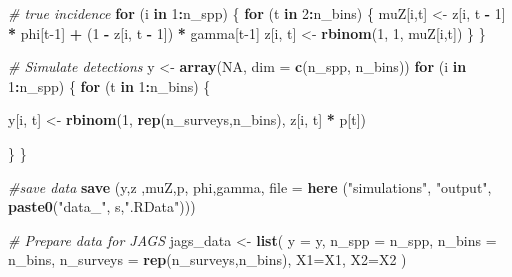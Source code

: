 \documentclass[
]{article}
\newenvironment{Shaded}{\begin{snugshade}}{\end{snugshade}}
\newcommand{\AttributeTok}[1]{\textcolor[rgb]{0.13,0.29,0.53}{#1}}
\newcommand{\CommentTok}[1]{\textcolor[rgb]{0.56,0.35,0.01}{\textit{#1}}}
\newcommand{\ConstantTok}[1]{\textcolor[rgb]{0.56,0.35,0.01}{#1}}
\newcommand{\ControlFlowTok}[1]{\textcolor[rgb]{0.13,0.29,0.53}{\textbf{#1}}}
\newcommand{\DecValTok}[1]{\textcolor[rgb]{0.00,0.00,0.81}{#1}}
\newcommand{\FunctionTok}[1]{\textcolor[rgb]{0.13,0.29,0.53}{\textbf{#1}}}
\newcommand{\NormalTok}[1]{#1}
\newcommand{\OtherTok}[1]{\textcolor[rgb]{0.56,0.35,0.01}{#1}}
\newcommand{\SpecialCharTok}[1]{\textcolor[rgb]{0.81,0.36,0.00}{\textbf{#1}}}
\newcommand{\StringTok}[1]{\textcolor[rgb]{0.31,0.60,0.02}{#1}}
\begin{document}
{\begin{Shaded}
\begin{Highlighting}[]
        \CommentTok{\# true incidence}
        \ControlFlowTok{for}\NormalTok{ (i }\ControlFlowTok{in} \DecValTok{1}\SpecialCharTok{:}\NormalTok{n\_spp) \{}
            \ControlFlowTok{for}\NormalTok{ (t }\ControlFlowTok{in} \DecValTok{2}\SpecialCharTok{:}\NormalTok{n\_bins) \{}
\NormalTok{              muZ[i,t] }\OtherTok{\textless{}{-}}\NormalTok{ z[i, t }\SpecialCharTok{{-}} \DecValTok{1}\NormalTok{] }\SpecialCharTok{*}\NormalTok{ phi[t}\DecValTok{{-}1}\NormalTok{] }\SpecialCharTok{+}\NormalTok{ (}\DecValTok{1} \SpecialCharTok{{-}}\NormalTok{ z[i, t }\SpecialCharTok{{-}} \DecValTok{1}\NormalTok{]) }\SpecialCharTok{*}\NormalTok{ gamma[t}\DecValTok{{-}1}\NormalTok{]}
\NormalTok{              z[i, t] }\OtherTok{\textless{}{-}} \FunctionTok{rbinom}\NormalTok{(}\DecValTok{1}\NormalTok{, }\DecValTok{1}\NormalTok{, muZ[i,t])}
\NormalTok{          \}}
\NormalTok{        \}}
        
        \CommentTok{\# Simulate detections}
\NormalTok{        y }\OtherTok{\textless{}{-}} \FunctionTok{array}\NormalTok{(}\ConstantTok{NA}\NormalTok{, }\AttributeTok{dim =} \FunctionTok{c}\NormalTok{(n\_spp, n\_bins))}
        \ControlFlowTok{for}\NormalTok{ (i }\ControlFlowTok{in} \DecValTok{1}\SpecialCharTok{:}\NormalTok{n\_spp) \{}
          \ControlFlowTok{for}\NormalTok{ (t }\ControlFlowTok{in} \DecValTok{1}\SpecialCharTok{:}\NormalTok{n\_bins) \{}
            
\NormalTok{              y[i, t] }\OtherTok{\textless{}{-}} \FunctionTok{rbinom}\NormalTok{(}\DecValTok{1}\NormalTok{, }\FunctionTok{rep}\NormalTok{(n\_surveys,n\_bins), z[i, t] }\SpecialCharTok{*}\NormalTok{ p[t])}
            
\NormalTok{          \}}
\NormalTok{        \}}
        
        \CommentTok{\#save data}
        \FunctionTok{save}\NormalTok{ (y,z ,muZ,p, phi,gamma, }\AttributeTok{file =} \FunctionTok{here}\NormalTok{ (}\StringTok{"simulations"}\NormalTok{, }\StringTok{"output"}\NormalTok{, }\FunctionTok{paste0}\NormalTok{(}\StringTok{"data\_"}\NormalTok{, s,}\StringTok{".RData"}\NormalTok{)))}
        
        \CommentTok{\# Prepare data for JAGS}
\NormalTok{        jags\_data }\OtherTok{\textless{}{-}} \FunctionTok{list}\NormalTok{(}
          \AttributeTok{y =}\NormalTok{ y,}
          \AttributeTok{n\_spp =}\NormalTok{ n\_spp,}
          \AttributeTok{n\_bins =}\NormalTok{ n\_bins,}
          \AttributeTok{n\_surveys =} \FunctionTok{rep}\NormalTok{(n\_surveys,n\_bins),}
          \AttributeTok{X1=}\NormalTok{X1,}
          \AttributeTok{X2=}\NormalTok{X2}
\NormalTok{        )}
        

\end{Highlighting}
\end{Shaded}}
\end{document}
